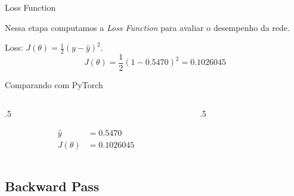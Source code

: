 \documentclass[aspectratio=169, xcolor=dvipsnames]{beamer}
\begin{document}
  \begin{frame}{Loss Function}
    \vspace{5pt}
    \begin{figure}
      \centering
      
    \end{figure}
    \vspace{10pt}
    \vfill
    Nessa etapa computamos a \textit{Loss Function} para avaliar o desempenho da
    rede.

    Loss: $J(\theta)=\frac{1}{2}(y-\hat{y})^{2}$.
    \[
      J(\theta) = \frac{1}{2}(1 - 0.5470)^{2}= 0.1026045
    \]
  \end{frame}

  \begin{frame}{Comparando com PyTorch}
    \begin{columns}
      \begin{column}{.5\linewidth}
        \vfill
        \begin{figure}
          \resizebox{\textwidth}{!}{
          
          }
        \end{figure}
        \vfill
        \begin{align*}
          \hat{y}   & = 0.5470    \\
          J(\theta) & = 0.1026045
        \end{align*}
        \vfill
      \end{column}
      \begin{column}{.5\linewidth}
        \centering
        \resizebox*{!}{.75\textheight}{ %
        }
      \end{column}
    \end{columns}
  \end{frame}

  \subsection{Backward Pass}
\end{document}
